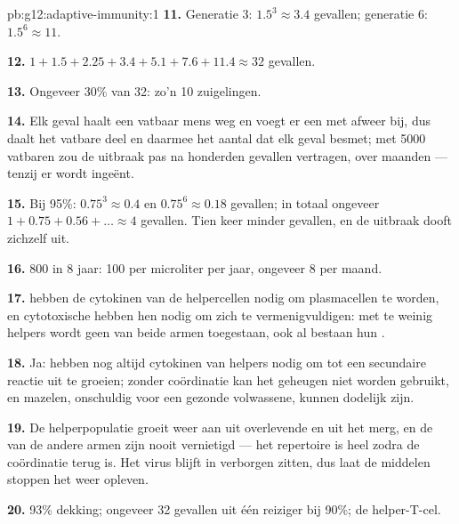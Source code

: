 \begin{solution}{pb:g12:adaptive-immunity:1}
\textbf{11.} Generatie 3: $1.5^3 \approx 3.4$ gevallen; generatie 6:
$1.5^6 \approx 11$.

\textbf{12.} $1 + 1.5 + 2.25 + 3.4 + 5.1 + 7.6 + 11.4 \approx 32$ gevallen.

\textbf{13.} Ongeveer 30\% van 32: zo'n 10 zuigelingen.

\textbf{14.} Elk geval haalt een vatbaar mens weg en voegt er een met
afweer bij, dus daalt het vatbare deel en daarmee het aantal dat elk geval
besmet; met 5000 vatbaren zou de uitbraak pas na honderden gevallen
vertragen, over maanden --- tenzij er wordt ingeënt.

\textbf{15.} Bij 95\%: $0.75^3 \approx 0.4$ en $0.75^6 \approx 0.18$
gevallen; in totaal ongeveer $1 + 0.75 + 0.56 + \dots \approx 4$ gevallen.
Tien keer minder gevallen, en de uitbraak dooft zichzelf uit.

\textbf{16.} 800 in 8 jaar: 100 per microliter per jaar, ongeveer 8 per
maand.

\textbf{17.}  hebben de cytokinen van de helpercellen nodig om
plasmacellen te worden, en cytotoxische  hebben hen nodig om zich
te vermenigvuldigen: met te weinig helpers wordt geen van beide armen
toegestaan, ook al bestaan hun .

\textbf{18.} Ja:  hebben nog altijd cytokinen van helpers
nodig om tot een secundaire reactie uit te groeien; zonder coördinatie kan
het geheugen niet worden gebruikt, en mazelen, onschuldig voor een gezonde
volwassene, kunnen dodelijk zijn.

\textbf{19.} De helperpopulatie groeit weer aan uit overlevende  en
uit het merg, en de  van de andere armen zijn nooit
vernietigd --- het repertoire is heel zodra de coördinatie terug is. Het
virus blijft in verborgen  zitten, dus laat de middelen stoppen het
weer opleven.

\textbf{20.} 93\% dekking; ongeveer 32 gevallen uit één reiziger bij 90\%;
de helper-T-cel.
\end{solution}
